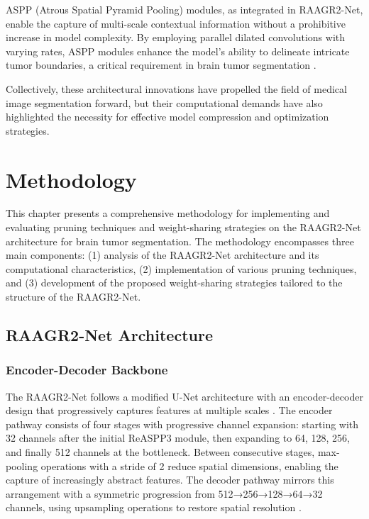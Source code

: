 \documentclass[12pt,a4paper]{article}
\begin{document}
ASPP (Atrous Spatial Pyramid Pooling) modules, as integrated in RAAGR2-Net, enable the capture of multi-scale contextual information without a prohibitive increase in model complexity. By employing parallel dilated convolutions with varying rates, ASPP modules enhance the model's ability to delineate intricate tumor boundaries, a critical requirement in brain tumor segmentation \cite{Chen2018ASPP, Rehman2023RAAGR2}.

Collectively, these architectural innovations have propelled the field of medical image segmentation forward, but their computational demands have also highlighted the necessity for effective model compression and optimization strategies.

\section{Methodology}
\label{sec:methodology}

This chapter presents a comprehensive methodology for implementing and evaluating pruning techniques and weight-sharing strategies on the RAAGR2-Net architecture for brain tumor segmentation. The methodology encompasses three main components: (1) analysis of the RAAGR2-Net architecture and its computational characteristics, (2) implementation of various pruning techniques, and (3) development of the proposed weight-sharing strategies tailored to the structure of the RAAGR2-Net.

\subsection{RAAGR2-Net Architecture}

\subsubsection{Encoder-Decoder Backbone}

The RAAGR2-Net follows a modified U-Net architecture with an encoder-decoder design that progressively captures features at multiple scales \cite{Rehman2023RAAGR2}. The encoder pathway consists of four stages with progressive channel expansion: starting with 32 channels after the initial ReASPP3 module, then expanding to 64, 128, 256, and finally 512 channels at the bottleneck. Between consecutive stages, max-pooling operations with a stride of 2 reduce spatial dimensions, enabling the capture of increasingly abstract features. The decoder pathway mirrors this arrangement with a symmetric progression from 512→256→128→64→32 channels, using upsampling operations to restore spatial resolution \cite{Alom2019R2UNet}.
\end{document}
